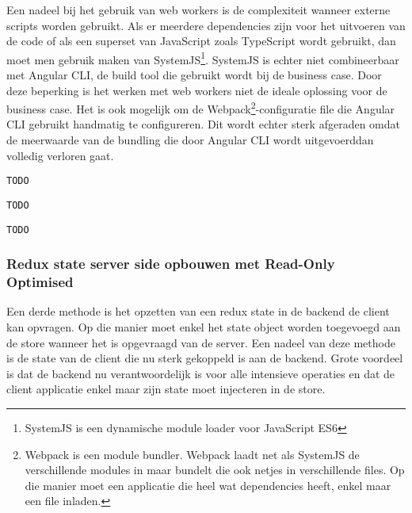 Een nadeel bij het gebruik van web workers is de complexiteit wanneer externe scripts worden gebruikt. Als er meerdere dependencies zijn voor het uitvoeren van de code of als een superset van JavaScript zoals TypeScript wordt gebruikt, dan moet men gebruik maken van SystemJS\footnote{SystemJS is een dynamische module loader voor JavaScript ES6}. SystemJS is echter niet combineerbaar met Angular CLI, de build tool die gebruikt wordt bij de business case. Door deze beperking is het werken met web workers niet de ideale oplossing voor de business case. Het is ook mogelijk om de Webpack\footnote{Webpack is een module bundler. Webpack laadt net als SystemJS de verschillende modules in maar bundelt die ook netjes in verschillende files. Op die manier moet een applicatie die heel wat dependencies heeft, enkel maar een file inladen.}-configuratie file die Angular CLI gebruikt handmatig te configureren. Dit wordt echter sterk afgeraden omdat de meerwaarde van de bundling die door Angular CLI wordt uitgevoerddan volledig verloren gaat.

\begin{lstlisting}[caption=Creatie van een web worker]
TODO
\end{lstlisting}

\begin{lstlisting}[caption=Communicatie tussen applicatie en webworker]
TODO
\end{lstlisting}

\begin{lstlisting}[caption=Voorbeeld van verwerken web worker]
TODO
\end{lstlisting}

\subsubsection{Redux state server side opbouwen met Read-Only Optimised}
\label{sssec: redux-server-side}
Een derde methode is het opzetten van een redux state in de backend de client kan opvragen. Op die manier moet enkel het state object worden toegevoegd aan de store wanneer het is opgevraagd van de server. Een nadeel van deze methode is de state van de client die nu sterk gekoppeld is aan de backend. Grote voordeel is dat de backend nu verantwoordelijk is voor alle intensieve operaties en dat de client applicatie enkel maar zijn state moet injecteren in de store. 

